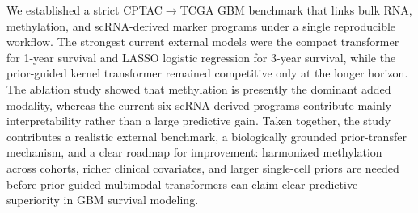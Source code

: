 We established a strict CPTAC$\rightarrow$TCGA GBM benchmark that links bulk RNA, methylation, and scRNA-derived marker programs under a single reproducible workflow. The strongest current external models were the compact transformer for 1-year survival and LASSO logistic regression for 3-year survival, while the prior-guided kernel transformer remained competitive only at the longer horizon. The ablation study showed that methylation is presently the dominant added modality, whereas the current six scRNA-derived programs contribute mainly interpretability rather than a large predictive gain. Taken together, the study contributes a realistic external benchmark, a biologically grounded prior-transfer mechanism, and a clear roadmap for improvement: harmonized methylation across cohorts, richer clinical covariates, and larger single-cell priors are needed before prior-guided multimodal transformers can claim clear predictive superiority in GBM survival modeling.
